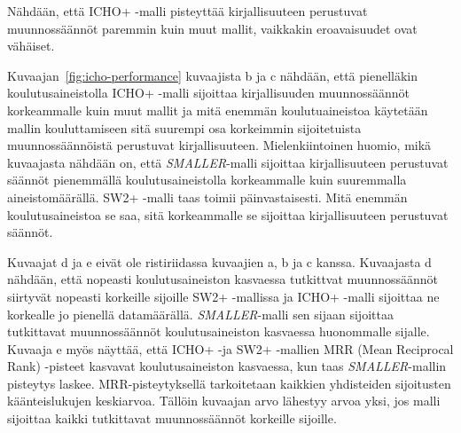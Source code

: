 \documentclass[finnish,twoside,censored,tkt,sw-line]{HYthesisML}
\begin{document}
Nähdään, että ICHO+ -malli pisteyttää kirjallisuuteen perustuvat muunnossäännöt paremmin kuin muut mallit, vaikkakin eroavaisuudet ovat vähäiset.

Kuvaajan~\ref{fig:icho-performance} kuvaajista b ja c nähdään, että pienelläkin koulutusaineistolla ICHO+ -malli sijoittaa kirjallisuuden muunnossäännöt korkeammalle kuin muut mallit ja mitä enemmän koulutuaineistoa käytetään mallin kouluttamiseen sitä suurempi osa korkeimmin sijoitetuista muunnossäännöistä perustuvat kirjallisuuteen.
Mielenkiintoinen huomio, mikä kuvaajasta nähdään on, että \emph{SMALLER}-malli sijoittaa kirjallisuuteen perustuvat säännöt pienemmällä koulutusaineistolla korkeammalle kuin suuremmalla aineistomäärällä.
SW2+ -malli taas toimii päinvastaisesti.
Mitä enemmän koulutusaineistoa se saa, sitä korkeammalle se sijoittaa kirjallisuuteen perustuvat säännöt.

Kuvaajat d ja e eivät ole ristiriidassa kuvaajien a, b ja c kanssa.
Kuvaajasta d nähdään, että nopeasti koulutusaineiston kasvaessa tutkittvat muunnossäännöt siirtyvät nopeasti korkeille sijoille SW2+ -mallissa ja ICHO+ -malli sijoittaa ne korkealle jo pienellä datamäärällä.
\emph{SMALLER}-malli sen sijaan sijoittaa tutkittavat muunnossäännöt koulutusaineiston kasvaessa huonommalle sijalle.
Kuvaaja e myös näyttää, että ICHO+ -ja SW2+ -mallien MRR (Mean Reciprocal Rank) -pisteet kasvavat koulutusaineiston kasvaessa, kun taas \emph{SMALLER}-mallin pisteytys laskee.
MRR-pisteytyksellä tarkoitetaan kaikkien yhdisteiden sijoitusten käänteislukujen keskiarvoa.
Tällöin kuvaajan arvo lähestyy arvoa yksi, jos malli sijoittaa kaikki tutkittavat muunnossäännöt korkeille sijoille.
\end{document}
